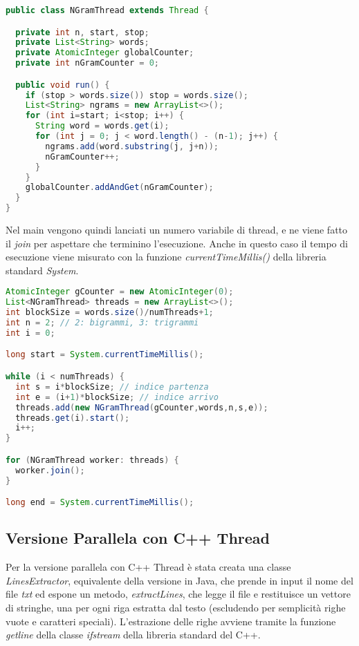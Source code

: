 \documentclass[10pt,twocolumn,letterpaper]{article}
\begin{document}
\begin{lstlisting}[basicstyle=\scriptsize, language=Java, frame=single, caption={Esempio di ricerca di bigrammi/trigrammi con Java Thread},captionpos=b]
public class NGramThread extends Thread {

  private int n, start, stop;
  private List<String> words;
  private AtomicInteger globalCounter;
  private int nGramCounter = 0;

  public void run() {
    if (stop > words.size()) stop = words.size();
    List<String> ngrams = new ArrayList<>();
    for (int i=start; i<stop; i++) {
      String word = words.get(i);
      for (int j = 0; j < word.length() - (n-1); j++) {
        ngrams.add(word.substring(j, j+n));
        nGramCounter++;
      }
    }
    globalCounter.addAndGet(nGramCounter);
  }
}
\end{lstlisting}
Nel main vengono quindi lanciati un numero variabile di thread, e ne viene fatto il \textit{join} per aspettare che terminino l'esecuzione. 
Anche in questo caso il tempo di esecuzione viene misurato con la funzione \textit{currentTimeMillis()} della libreria standard \textit{System}.\newline

\begin{lstlisting}[basicstyle=\scriptsize, language=Java, frame=single, caption={Lancio di Java Thread per ricerca di bigrammi/trigrammi},captionpos=b]
AtomicInteger gCounter = new AtomicInteger(0);
List<NGramThread> threads = new ArrayList<>();
int blockSize = words.size()/numThreads+1;
int n = 2; // 2: bigrammi, 3: trigrammi
int i = 0;

long start = System.currentTimeMillis();

while (i < numThreads) {
  int s = i*blockSize; // indice partenza
  int e = (i+1)*blockSize; // indice arrivo
  threads.add(new NGramThread(gCounter,words,n,s,e));
  threads.get(i).start();
  i++;
}

for (NGramThread worker: threads) {
  worker.join();
}

long end = System.currentTimeMillis();
\end{lstlisting}

\subsection{Versione Parallela con C++ Thread}
Per la versione parallela con C++ Thread è stata creata una classe \textit{LinesExtractor}, equivalente della versione in Java, che prende in input il nome del file \textit{txt} ed espone un metodo, \textit{extractLines}, che legge il file e restituisce un vettore di stringhe, una per ogni riga estratta dal testo (escludendo per semplicità righe vuote e caratteri speciali). L'estrazione delle righe avviene tramite la funzione \textit{getline} della classe \textit{ifstream} della libreria standard del C++.
\end{document}
